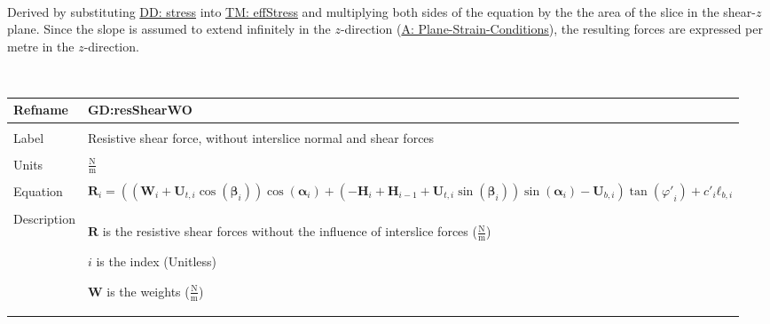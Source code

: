 \documentclass[12pt]{article}
\begin{document}
\paragraph{}
\label{GD:effNormFDeriv}
Derived by substituting \hyperref[DD:stress]{DD: stress} into \hyperref[TM:effStress]{TM: effStress} and multiplying both sides of the equation by the the area of the slice in the shear-$z$ plane. Since the slope is assumed to extend infinitely in the $z$-direction (\hyperref[assumpPSC]{A: Plane-Strain-Conditions}), the resulting forces are expressed per metre in the $z$-direction.
\par~

\noindent \begin{minipage}{\textwidth}
          \begin{tabular}{>{\raggedright}p{}>{\raggedright\arraybackslash}p{}}
          \toprule \textbf{Refname} & \textbf{GD:resShearWO}
          \label{GD:resShearWO}
          \\ \midrule \\
          Label & Resistive shear force, without interslice normal and shear forces
          \\ \midrule \\
          Units & $\frac{\text{N}}{\text{m}}$
          \\ \midrule \\
          Equation & \begin{displaymath}
                     {\mathbf{R}}_{i}=\left(\left({\mathbf{W}}_{i}+{\mathbf{U}_{t,i}} \cos\left({\mathbf{β}}_{i}\right)\right) \cos\left({\mathbf{α}}_{i}\right)+\left(-{\mathbf{H}}_{i}+{\mathbf{H}}_{i-1}+{\mathbf{U}_{t,i}} \sin\left({\mathbf{β}}_{i}\right)\right) \sin\left({\mathbf{α}}_{i}\right)-{\mathbf{U}_{b,i}}\right) \tan\left({φ'}_{i}\right)+{c'}_{i} {\mathbf{ℓ}_{b,i}}
                     \end{displaymath}
          \\ \midrule \\
          Description & \begin{symbDescription}
                        \item{$\mathbf{R}$ is the resistive shear forces without the influence of interslice forces ($\frac{\text{N}}{\text{m}}$)}
                        \item{$i$ is the index (Unitless)}
                        \item{$\mathbf{W}$ is the weights ($\frac{\text{N}}{\text{m}}$)}

\end{symbDescription}
\end{tabular}
\end{minipage}
\end{document}
